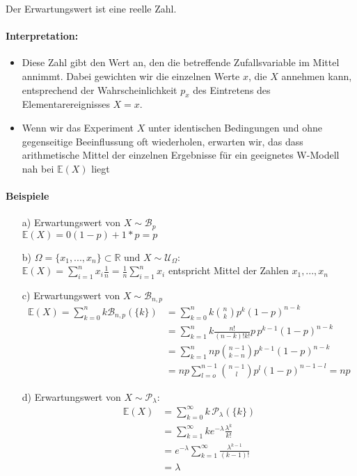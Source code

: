 \documentclass[12pt,a4paper]{article}
\begin{document}
 	Der Erwartungswert ist eine reelle Zahl.
 	\paragraph{Interpretation:}
 	\begin{itemize}
 	\item Diese Zahl gibt den Wert an, den die betreffende Zufallsvariable im Mittel annimmt. Dabei gewichten wir die einzelnen Werte $x$, die $X$ annehmen kann, entsprechend der Wahrscheinlichkeit $p_x$ des Eintretens des Elementarereignisses $X=x$.
	\item Wenn wir das Experiment $X$ unter identischen Bedingungen und ohne gegenseitige Beeinflussung oft wiederholen, erwarten wir, das dass arithmetische Mittel der einzelnen Ergebnisse für ein geeignetes W-Modell nah bei $\mathbb{E}(X)$ liegt
	\end{itemize}
 	
 	\paragraph{Beispiele}
 	\begin{itemize}
 	\item[a)] Erwartungswert von $X\sim\mathcal{B}_p$ \\ 
$\mathbb{E}(X)=0(1-p)+1*p=p$
 	\item[b)] $\Omega=\{x_1,...,x_n\}\subset\mathbb{R} \text{ und } X\sim\mathcal{U_{\Omega}}:$ \\
$\mathbb{E}(X) = \sum_{i=1}^n x_i \frac{1}{n} = \frac{1}{n} \sum^n_{i=1}x_i$ entspricht Mittel der Zahlen $x_1,...,x_n$
	\item[c) ] Erwartungswert von $X\sim\mathcal{B}_{n,p}$
	\begin{equation*}
	\begin{split}
	\mathbb{E}(X)=\sum^n_{k=0} k\mathcal{B}_{n,p}(\{k\}) & = \sum^n_{k=0}k\binom{n}{k}p^k (1-p)^{n-k} \\
	& = \sum^n_{k=1}k\frac{n!}{(n-k)!k!}p\,p^{k-1}(1-p)^{n-k}\\
	& = \sum^n_{k=1}np\binom{n-1}{k-n}p^{k-1}(1-p)^{n-k}\\
	& = np\sum^{n-1}_{l=o}\binom{n-1}{l}p^l (1-p)^{n-1-l}=np
	\end{split}
	\end{equation*}	
	\item[d) ] Erwartungswert von $X\sim\mathcal{P}_{\lambda}$:
	\begin{equation*}
	\begin{split}
	\mathbb{E}(X) & = \sum^{\infty}_{k=0}k\,\mathcal{P}_{\lambda}(\{k\})\\
	 & = \sum^{\infty}_{k=1}ke^{-\lambda}\frac{\lambda^k}{k!}\\
	 & = e^{-\lambda}\sum^{\infty}_{k=1}\frac{\lambda^{k-1}}{(k-1)!}\\
	 & =\lambda
	\end{split}
	\end{equation*}
 	\end{itemize}
 	
\end{document}
